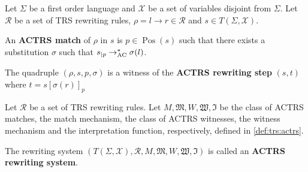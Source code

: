 \documentclass{book}
\begin{document}
\begin{definition}
  \label{def:trs:actrs}
  Let $\Sigma$ be a first order language and $\mathcal{X}$ be a set of variables disjoint from $\Sigma$.
  Let $\mathcal{R}$ be a set of TRS rewriting rules, $\rho = l \to r \in \mathcal{R}$ and $s \in T(\Sigma, \mathcal{X})$.

  An \textbf{ACTRS match} of $\rho$ in $s$ is $p \in \operatorname{Pos}(s)$ such that there exists a substitution $\sigma$ such that $s_{|p} \rightarrow_{\operatorname{AC}}^* \sigma(l)$. 


  The quadruple $(\rho, s, p, \sigma)$ is a witness of the \textbf{ACTRS rewriting step} $(s, t)$ where $t = s[\sigma(r)]_p$

\end{definition}

   

 
\begin{definition}
  Let $\mathcal{R}$ be a set of TRS rewriting rules. 
  Let $M, \mathfrak{M}, W, \mathfrak{W}, \mathfrak{I}$ be the class of ACTRS matches, the match mechanism, the class of ACTRS witnesses, the witness mechanism and the interpretation function, respectively, defined in \autoref{def:trs:actrs}.

  The rewriting system $(T(\Sigma,\mathcal{X}), \mathcal{R}, M, \mathfrak{M}, W, \mathfrak{W}, \mathfrak{I})$ is called an \textbf{ACTRS rewriting system}.
\end{definition}
\end{document}
